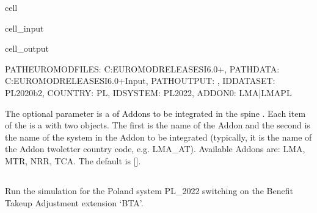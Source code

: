 \documentclass[letterpaper,10pt,english]{sphinxmanual}
\begin{document}
\begin{sphinxuseclass}{cell}
\begin{sphinxuseclass}{cell_input}
\begin{sphinxVerbatim}[commandchars=\\\{\}]
\end{sphinxVerbatim}

\end{sphinxuseclass}
\begin{sphinxuseclass}{cell_output}
\begin{sphinxVerbatim}[commandchars=\\\{\}]
\PYGZob{}\PYGZsq{}PATH\PYGZus{}EUROMODFILES\PYGZsq{}: \PYGZsq{}C:\PYGZbs{}\PYGZbs{}EUROMOD\PYGZus{}RELEASES\PYGZus{}I6.0+\PYGZsq{},
 \PYGZsq{}PATH\PYGZus{}DATA\PYGZsq{}: \PYGZsq{}C:\PYGZbs{}\PYGZbs{}EUROMOD\PYGZus{}RELEASES\PYGZus{}I6.0+\PYGZbs{}\PYGZbs{}Input\PYGZsq{},
 \PYGZsq{}PATH\PYGZus{}OUTPUT\PYGZsq{}: \PYGZsq{}\PYGZsq{},
 \PYGZsq{}ID\PYGZus{}DATASET\PYGZsq{}: \PYGZsq{}PL\PYGZus{}2020\PYGZus{}b2\PYGZsq{},
 \PYGZsq{}COUNTRY\PYGZsq{}: \PYGZsq{}PL\PYGZsq{},
 \PYGZsq{}ID\PYGZus{}SYSTEM\PYGZsq{}: \PYGZsq{}PL\PYGZus{}2022\PYGZsq{},
 \PYGZsq{}ADDON0\PYGZsq{}: \PYGZsq{}LMA|LMA\PYGZus{}PL\PYGZsq{}\PYGZcb{}
\end{sphinxVerbatim}

\end{sphinxuseclass}
\end{sphinxuseclass}
\sphinxAtStartPar
The optional parameter  is a  of   Addons to be integrated in the spine . Each item of the  is   a  with two  objects. The first   is the name of the Addon and the second  is the name of the system in the Addon to be integrated (typically, it is the name of the Addon \sphinxcode{\sphinxupquote{\_}} two\sphinxhyphen{}letter country code, e.g. LMA\_AT).  Available Addons are: LMA, MTR, NRR, TCA. The default is {[}{]}.


\subsection{}
\label{\detokenize{example:run-with-extensions}}
\sphinxAtStartPar
Run the simulation for the Poland system PL\_2022 switching on the Benefit Take\sphinxhyphen{}up Adjustment extension ‘BTA’.
\end{document}
